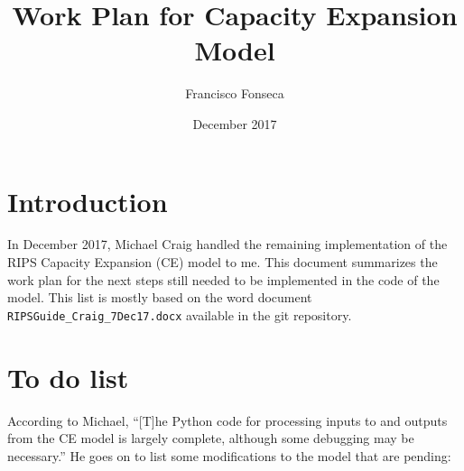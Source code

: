 \documentclass[11pt, oneside]{article}   	%
\title{Work Plan for Capacity Expansion Model}
\author{Francisco Fonseca}
\date{December 2017}							%
\begin{document}
\maketitle
\section{Introduction}

In December 2017, Michael Craig handled the remaining implementation of the RIPS Capacity Expansion (CE) model to me. This document summarizes the work plan for the next steps still needed to be implemented in the code of the model. This list is mostly based on the word document \texttt{RIPSGuide\_Craig\_7Dec17.docx} available in the git repository.

\section{To do list}

According to Michael, ``[T]he Python code for processing inputs to and outputs from the CE model is largely complete, although some debugging may be necessary.'' He goes on to list some modifications to the model that are pending:
\end{document}
